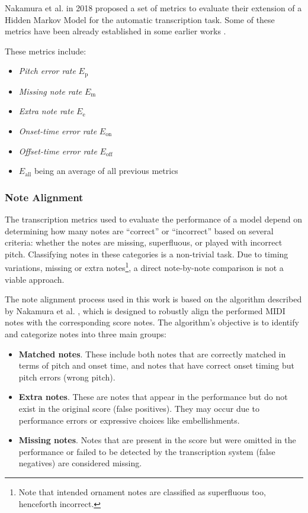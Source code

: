 Nakamura et al. in 2018 proposed a set of metrics to evaluate their extension of a Hidden Markov Model \cite{Nakamura2018} for the automatic transcription task. Some of these metrics have been already established in some earlier works \cite{Nakamura2017a}.

These metrics include: \begin{itemize}
	\item \emph{Pitch error rate} $E_{\textrm{p}}$
	\item \emph{Missing note rate} $E_{\textrm{m}}$
	\item \emph{Extra note rate} $E_{\textrm{e}}$
	\item \emph{Onset-time error rate} $E_{\textrm{on}}$
	\item \emph{Offset-time error rate} $E_{\textrm{off}}$
	\item $E_{\textrm{all}}$ being an average of all previous metrics
\end{itemize}

\subsubsection{Note Alignment}

The transcription metrics used to evaluate the performance of a model depend on determining how many notes are ``correct'' or ``incorrect'' based on several criteria: whether the notes are missing, superfluous, or played with incorrect pitch. Classifying notes in these categories is a non-trivial task. Due to timing variations, missing or extra notes\footnote{Note that intended ornament notes are classified as superfluous too, henceforth incorrect.}, a direct note-by-note comparison is not a viable approach.

The note alignment process used in this work is based on the algorithm described by Nakamura et al. \cite{Nakamura2017b}, which is designed to robustly align the performed MIDI notes with the corresponding score notes. The algorithm’s objective is to identify and categorize notes into three main groups: \begin{itemize}
	\item {\bf Matched notes}. These include both notes that are correctly matched in terms of pitch and onset time, and notes that have correct onset timing but pitch errors (wrong pitch).
	\item {\bf Extra notes}. These are notes that appear in the performance but do not exist in the original score (false positives). They may occur due to performance errors or expressive choices like embellishments.
	\item {\bf Missing notes}. Notes that are present in the score but were omitted in the performance or failed to be detected by the transcription system (false negatives) are considered missing.
\end{itemize}


